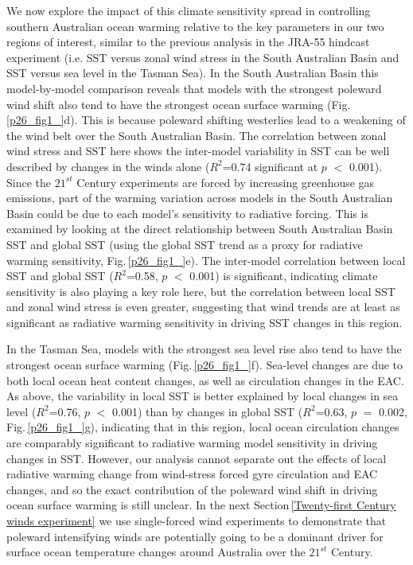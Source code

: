 \documentclass[draft,linenumbers]{agujournal2018}
\begin{document}
We now explore the impact of this climate sensitivity spread in controlling southern Australian ocean warming relative to the key parameters in our two regions of interest, similar to the previous analysis in the JRA-55 hindcast experiment (i.e. SST versus zonal wind stress in the South Australian Basin and SST versus sea level in the Tasman Sea). In the South Australian Basin this model-by-model comparison reveals that models with the strongest poleward wind shift also tend to have the strongest ocean surface warming (Fig.\,\ref{p26_fig1_}d). This is because poleward shifting westerlies lead to a weakening of the wind belt over the South Australian Basin. The correlation between zonal wind stress and SST here shows the inter-model variability in SST can be well described by changes in the winds alone ($R^2$=0.74 significant at $p$ $<$ 0.001). Since the $21^{st}$ Century experiments are forced by increasing greenhouse gas emissions, part of the warming variation across models in the South Australian Basin could be due to each model's sensitivity to radiative forcing. This is examined by looking at the direct relationship between South Australian Basin SST and global SST (using the global SST trend as a proxy for radiative warming sensitivity, Fig.\,\ref{p26_fig1_}e). The inter-model correlation between local SST and global SST ($R^2$=0.58, $p$ $<$ 0.001) is significant, indicating climate sensitivity is also playing a key role here, but the correlation between local SST and zonal wind stress is even greater, suggesting that wind trends are at least as significant as radiative warming sensitivity in driving SST changes in this region.

In the Tasman Sea, models with the strongest sea level rise also tend to have the strongest ocean surface warming (Fig.\,\ref{p26_fig1_}f). Sea-level changes are due to both local ocean heat content changes, as well as circulation changes in the EAC. As above, the variability in local SST is better explained by local changes in sea level ($R^2$=0.76, $p$ $<$ 0.001) than by changes in global SST ($R^2$=0.63, $p$ $=$ 0.002, Fig.\,\ref{p26_fig1_}g), indicating that in this region, local ocean circulation changes are comparably significant to radiative warming model sensitivity in driving changes in SST. However, our analysis cannot separate out the effects of local radiative warming change from wind-stress forced gyre circulation and EAC changes, and so the exact contribution of the poleward wind shift in driving ocean surface warming is still unclear. In the next Section\,\ref{Twenty-first Century winds experiment} we use single-forced wind experiments to demonstrate that poleward intensifying winds are potentially going to be a dominant driver for surface ocean temperature changes around Australia over the $21^{st}$ Century.
\end{document}
